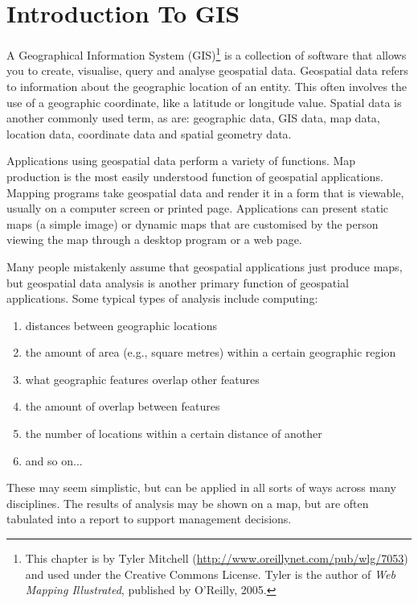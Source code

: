 
\section{Introduction To GIS}\label{label_intro}

A Geographical Information System (GIS)\cite{mitchel05}\footnote{This chapter is by Tyler
Mitchell (\url{http://www.oreillynet.com/pub/wlg/7053}) and
used under the Creative Commons License. Tyler is the author of 
\textit{Web Mapping Illustrated}, published by O'Reilly, 2005.}
is a collection of software that allows you to create, visualise, query and
analyse geospatial data. Geospatial data refers to information about the
geographic location of an entity. This often involves the use of a
geographic coordinate, like a latitude or longitude value. Spatial data is
another commonly used term, as are: geographic data, GIS data, map data,
location data, coordinate data and spatial geometry data.

Applications using geospatial data perform a variety of functions. Map
production is the most easily understood function of geospatial
applications. Mapping programs take geospatial data and render it in a form
that is viewable, usually on a computer screen or printed page.
Applications can present static maps (a simple image) or dynamic maps that
are customised by the person viewing the map through a desktop program or a
web page.

Many people mistakenly assume that geospatial applications just produce
maps, but geospatial data analysis is another primary function of
geospatial applications. Some typical types of analysis include computing:

\begin{enumerate}
\item distances between geographic locations
\item the amount of area (e.g., square metres) within a certain geographic
region
\item what geographic features overlap other features
\item the amount of overlap between features
\item the number of locations within a certain distance of another
\item and so on...
\end{enumerate}

These may seem simplistic, but can be applied in all sorts of ways across
many disciplines. The results of analysis may be shown on a map, but are
often tabulated into a report to support management decisions.

